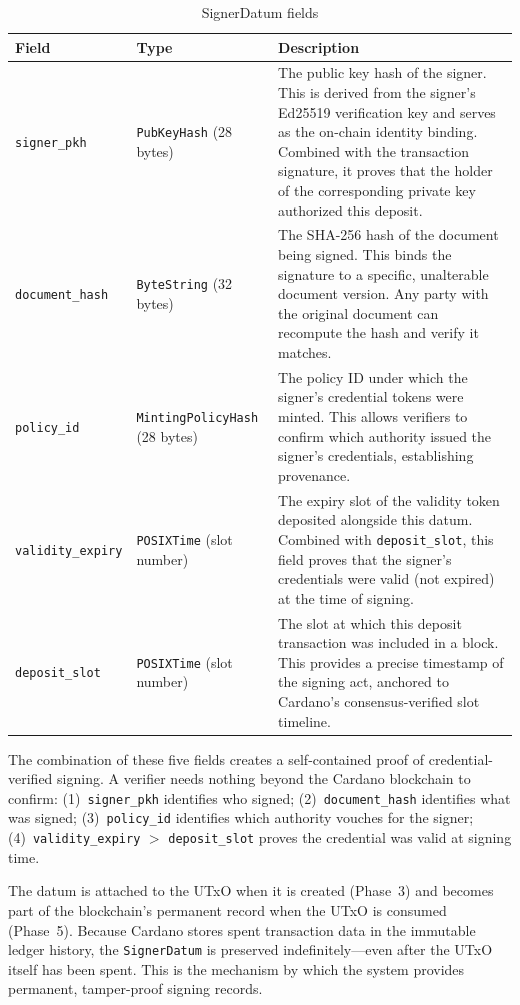 \begin{table}[H]
\centering
\caption{SignerDatum fields}
\label{tab:signer-datum}
\small
\begin{tabular}{@{}l l p{7cm}@{}}
\toprule
\textbf{Field} & \textbf{Type} & \textbf{Description} \\
\midrule
\texttt{signer\_pkh} & \texttt{PubKeyHash} (28 bytes) &
  The public key hash of the signer.  This is derived from the signer's
  Ed25519 verification key and serves as the on-chain identity binding.
  Combined with the transaction signature, it proves that the holder of
  the corresponding private key authorized this deposit. \\
\texttt{document\_hash} & \texttt{ByteString} (32 bytes) &
  The SHA-256 hash of the document being signed.  This binds the signature
  to a specific, unalterable document version.  Any party with the original
  document can recompute the hash and verify it matches. \\
\texttt{policy\_id} & \texttt{MintingPolicyHash} (28 bytes) &
  The policy ID under which the signer's credential tokens were minted.
  This allows verifiers to confirm which authority issued the signer's
  credentials, establishing provenance. \\
\texttt{validity\_expiry} & \texttt{POSIXTime} (slot number) &
  The expiry slot of the validity token deposited alongside this datum.
  Combined with \texttt{deposit\_slot}, this field proves that the signer's
  credentials were valid (not expired) at the time of signing. \\
\texttt{deposit\_slot} & \texttt{POSIXTime} (slot number) &
  The slot at which this deposit transaction was included in a block.
  This provides a precise timestamp of the signing act, anchored to
  Cardano's consensus-verified slot timeline. \\
\bottomrule
\end{tabular}
\end{table}

The combination of these five fields creates a self-contained proof of
credential-verified signing.  A verifier needs nothing beyond the Cardano
blockchain to confirm:  (1)~\texttt{signer\_pkh} identifies who signed;
(2)~\texttt{document\_hash} identifies what was signed;
(3)~\texttt{policy\_id} identifies which authority vouches for the signer;
(4)~\texttt{validity\_expiry} $>$ \texttt{deposit\_slot} proves the
credential was valid at signing time.

The datum is attached to the UTxO when it is created (Phase~3) and becomes
part of the blockchain's permanent record when the UTxO is consumed (Phase~5).
Because Cardano stores spent transaction data in the immutable ledger history,
the \texttt{SignerDatum} is preserved indefinitely---even after the UTxO
itself has been spent.  This is the mechanism by which the system provides
permanent, tamper-proof signing records.



